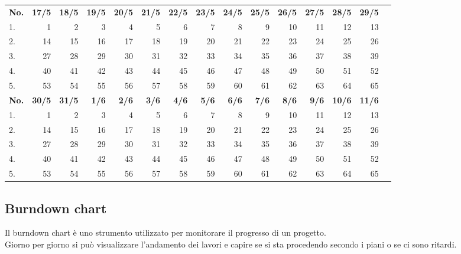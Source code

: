 \documentclass{article}
\begin{document}
\begin{table}[H]
    \centering
    \begin{tabularx}{\textwidth}{| X | r | r | r | r | r | r | r | r | r | r | r | r | r | r |}
        \Xhline{2pt}
        \textbf{No.} & \textbf{17/5} & \textbf{18/5} & \textbf{19/5} & \textbf{20/5} & \textbf{21/5} & \textbf{22/5} & \textbf{23/5} & \textbf{24/5} & \textbf{25/5} & \textbf{26/5} & \textbf{27/5} & \textbf{28/5} & \textbf{29/5} \\
        \Xhline{2pt}
        1. & 1 & 2 & 3 & 4 & 5 & 6 & 7 & 8 & 9 & 10 & 11 & 12 & 13 \\
        \hline
        2. & 14 & 15 & 16 & 17 & 18 & 19 & 20 & 21 & 22 & 23 & 24 & 25 & 26 \\
        \hline
        3. & 27 & 28 & 29 & 30 & 31 & 32 & 33 & 34 & 35 & 36 & 37 & 38 & 39 \\
        \hline
        4. & 40 & 41 & 42 & 43 & 44 & 45 & 46 & 47 & 48 & 49 & 50 & 51 & 52 \\
        \hline
        5. & 53 & 54 & 55 & 56 & 57 & 58 & 59 & 60 & 61 & 62 & 63 & 64 & 65 \\
        \Xhline{2pt}
        \textbf{No.} & \textbf{30/5} & \textbf{31/5} & \textbf{ 1/6} & \textbf{ 2/6} & \textbf{ 3/6} & \textbf{ 4/6} & \textbf{ 5/6} & \textbf{ 6/6} & \textbf{ 7/6} & \textbf{ 8/6} & \textbf{ 9/6} & \textbf{10/6} & \textbf{11/6} \\
        \Xhline{2pt}
        1. & 1 & 2 & 3 & 4 & 5 & 6 & 7 & 8 & 9 & 10 & 11 & 12 & 13 \\
        \hline
        2. & 14 & 15 & 16 & 17 & 18 & 19 & 20 & 21 & 22 & 23 & 24 & 25 & 26 \\
        \hline
        3. & 27 & 28 & 29 & 30 & 31 & 32 & 33 & 34 & 35 & 36 & 37 & 38 & 39 \\
        \hline
        4. & 40 & 41 & 42 & 43 & 44 & 45 & 46 & 47 & 48 & 49 & 50 & 51 & 52 \\
        \hline
        5. & 53 & 54 & 55 & 56 & 57 & 58 & 59 & 60 & 61 & 62 & 63 & 64 & 65 \\
        \hline
    \end{tabularx}
\end{table}

\clearpage

\subsection{Burndown chart}
Il burndown chart è uno strumento utilizzato per monitorare il progresso di un progetto.\\
Giorno per giorno si può visualizzare l'andamento dei lavori e capire se si sta procedendo secondo i piani o se ci sono ritardi.\\
\end{document}
